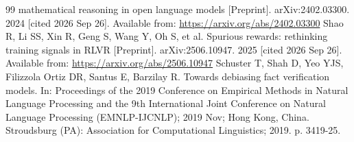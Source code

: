 \documentclass[10pt]{article}
\begin{document}
\begin{thebibliography}{99}
  mathematical reasoning in open language models [Preprint]. arXiv:2402.03300. 2024 [cited 2026 Sep 26].
  Available from: \url{https://arxiv.org/abs/2402.03300}
 Shao R, Li SS, Xin R, Geng S, Wang Y, Oh S, et al. Spurious rewards: rethinking training
  signals in RLVR [Preprint]. arXiv:2506.10947. 2025 [cited 2026 Sep 26].
  Available from: \url{https://arxiv.org/abs/2506.10947}
 Schuster T, Shah D, Yeo YJS, Filizzola Ortiz DR, Santus E, Barzilay R. Towards debiasing
  fact verification models. In: Proceedings of the 2019 Conference on Empirical Methods in Natural Language
  Processing and the 9th International Joint Conference on Natural Language Processing (EMNLP-IJCNLP);
  2019 Nov; Hong Kong, China. Stroudsburg (PA): Association for Computational Linguistics; 2019. p. 3419-25.
\end{thebibliography}
\end{document}
